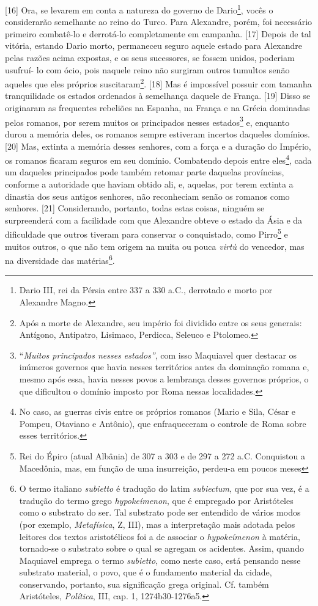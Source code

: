 {[}16{]} Ora, se levarem em conta a natureza do governo de
Dario\footnote{Dario III, rei da Pérsia entre 337 a 330 a.C., derrotado
  e morto por Alexandre Magno.}, vocês o considerarão semelhante ao
reino do Turco. Para Alexandre, porém, foi necessário primeiro
combatê-lo e derrotá-lo completamente em campanha. {[}17{]} Depois de
tal vitória, estando Dario morto, permaneceu seguro aquele estado para
Alexandre pelas razões acima expostas, e os seus sucessores, se fossem
unidos, poderiam usufruí- lo com ócio, pois naquele reino não surgiram
outros tumultos senão aqueles que eles próprios suscitaram\footnote{Após
  a morte de Alexandre, seu império foi dividido entre os seus generais:
  Antígono, Antipatro, Lisimaco, Perdicca, Seleuco e Ptolomeo.}.
{[}18{]} Mas é impossível possuir com tamanha tranquilidade os estados
ordenados à semelhança daquele de França. {[}19{]} Disso se originaram
as frequentes rebeliões na Espanha, na França e na Grécia dominadas
pelos romanos, por serem muitos os principados nesses estados\footnote{``\emph{Muitos
  principados nesses estados''}, com isso Maquiavel quer destacar os
  inúmeros governos que havia nesses territórios antes da dominação
  romana e, mesmo após essa, havia nesses povos a lembrança desses
  governos próprios, o que dificultou o domínio imposto por Roma nessas
  localidades.} e, enquanto durou a memória deles, os romanos sempre
estiveram incertos daqueles domínios. {[}20{]} Mas, extinta a memória
desses senhores, com a força e a duração do Império, os romanos ficaram
seguros em seu domínio. Combatendo depois entre eles\footnote{No caso,
  as guerras civis entre os próprios romanos (Mario e Sila, César e
  Pompeu, Otaviano e Antônio), que enfraqueceram o controle de Roma
  sobre esses territórios.}, cada um daqueles principados pode também
retomar parte daquelas províncias, conforme a autoridade que haviam
obtido ali, e, aquelas, por terem extinta a dinastia dos seus antigos
senhores, não reconheciam senão os romanos como senhores. {[}21{]}
Considerando, portanto, todas estas coisas, ninguém se surpreenderá com
a facilidade com que Alexandre obteve o estado da Ásia e da dificuldade
que outros tiveram para conservar o conquistado, como Pirro\footnote{Rei
  do Épiro (atual Albânia) de 307 a 303 e de 297 a 272 a.C. Conquistou a
  Macedônia, mas, em função de uma insurreição, perdeu-a em poucos meses} e muitos outros,
o que não tem origem na muita ou pouca \emph{virtù} do vencedor, mas na
diversidade das matérias\footnote{O termo italiano \emph{subietto} é
  tradução do latim \emph{subiectum}, que por sua vez, é a tradução do
  termo grego \emph{hypokeímenon}, que é empregado por Aristóteles como
  o substrato do ser. Tal substrato pode ser entendido de vários modos
  (por exemplo, \emph{Metafísica}, Z, III), mas a interpretação mais
  adotada pelos leitores dos textos aristotélicos foi a de associar o
  \emph{hypokeímenon} à matéria, tornado-se o substrato sobre o qual se
  agregam os acidentes. Assim, quando Maquiavel emprega o termo
  \emph{subietto}, como neste caso, está pensando nesse substrato
  material, o povo, que é o fundamento material da cidade, conservando,
  portanto, sua significação grega original. Cf. também Aristóteles,
  \emph{Política}, III, cap. 1, 1274b30-1276a5.}.

